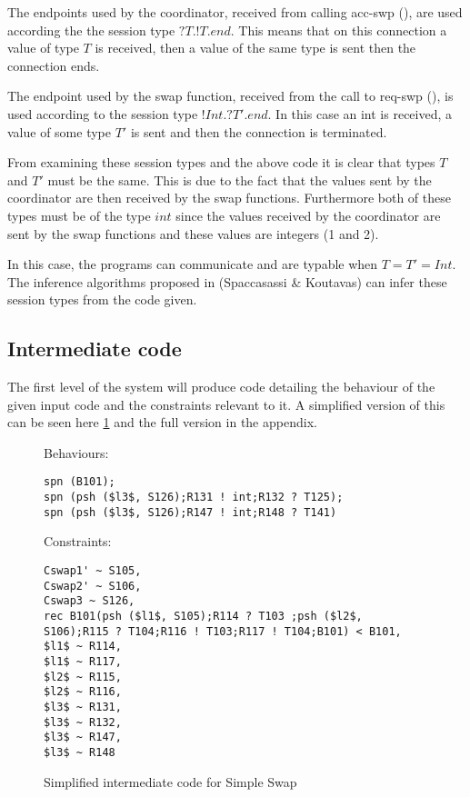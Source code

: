 The endpoints used by the coordinator, received from calling acc-swp (), are used according the the session type $?T.!T.end$. This means that on this connection a value of type $T$ is received, then a value of the same type is sent then the connection ends. 

The endpoint used by the swap function, received from the call to req-swp (), is used according to the session type $!Int.?T'.end$. In this case an int is received, a value of some type $T'$ is sent and then the connection is terminated. 

From examining these session types and the above code it is clear that types $T$ and $T'$ must be the same. This is due to the fact that the values sent by the coordinator are then received by the swap functions. Furthermore both of these types must be of the type $int$ since the values received by the coordinator are sent by the swap functions and these values are integers (1 and 2).

In this case, the programs can communicate and are typable when $T=T'=Int$. The inference algorithms proposed in (Spaccasassi \& Koutavas)\cite{paper1} can infer these session types from the code given. 

\subsection{Intermediate code}

The first level of the system will produce code detailing the behaviour of the given input code and the constraints relevant to it. A simplified version of this can be seen here \ref{simpleInter} and the full version in the appendix. 

\begin{figure}
Behaviours:
\begin{lstlisting}
spn (B101);
spn (psh ($l3$, S126);R131 ! int;R132 ? T125);
spn (psh ($l3$, S126);R147 ! int;R148 ? T141)
\end{lstlisting}
Constraints:
\begin{lstlisting}
Cswap1' ~ S105,
Cswap2' ~ S106,
Cswap3 ~ S126,
rec B101(psh ($l1$, S105);R114 ? T103 ;psh ($l2$, S106);R115 ? T104;R116 ! T103;R117 ! T104;B101) < B101,
$l1$ ~ R114,
$l1$ ~ R117,
$l2$ ~ R115,
$l2$ ~ R116,
$l3$ ~ R131,
$l3$ ~ R132,
$l3$ ~ R147,
$l3$ ~ R148
\end{lstlisting}
\caption{Simplified intermediate code for Simple Swap}
\label{simpleInter}
\end{figure}


